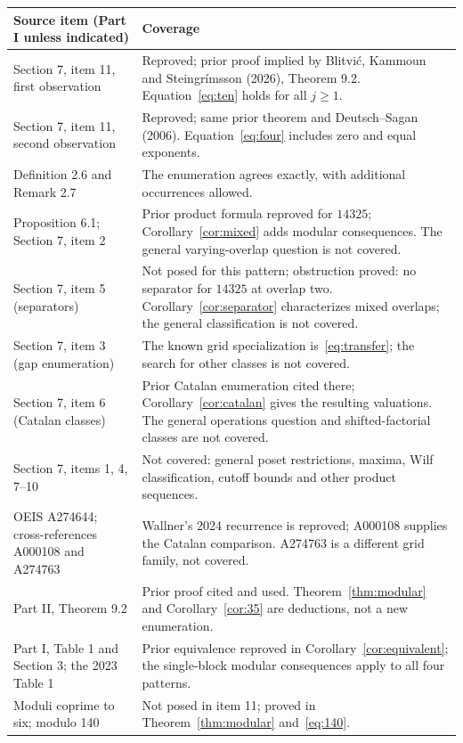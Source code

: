 \documentclass[11pt]{article}
\begin{document}
{\small
\begin{longtable}{p{.40\linewidth}p{.50\linewidth}}
\toprule
Source item (Part I unless indicated)&Coverage\\\midrule
\endhead
Section 7, item 11, first observation&Reproved; prior proof implied by Blitvi\'c, Kammoun and Steingr\'imsson (2026), Theorem 9.2. Equation~\eqref{eq:ten} holds for all $j\geq1$.\\
Section 7, item 11, second observation&Reproved; same prior theorem and Deutsch--Sagan (2006). Equation~\eqref{eq:four} includes zero and equal exponents.\\
Definition 2.6 and Remark 2.7&The enumeration agrees exactly, with additional occurrences allowed.\\
Proposition 6.1; Section 7, item 2&Prior product formula reproved for $14325$; Corollary~\ref{cor:mixed} adds modular consequences. The general varying-overlap question is not covered.\\
Section 7, item 5 (separators)&Not posed for this pattern; obstruction proved: no separator for $14325$ at overlap two. Corollary~\ref{cor:separator} characterizes mixed overlaps; the general classification is not covered.\\
Section 7, item 3 (gap enumeration)&The known grid specialization is~\eqref{eq:transfer}; the search for other classes is not covered.\\
Section 7, item 6 (Catalan classes)&Prior Catalan enumeration cited there; Corollary~\ref{cor:catalan} gives the resulting valuations. The general operations question and shifted-factorial classes are not covered.\\
Section 7, items 1, 4, 7--10&Not covered: general poset restrictions, maxima, Wilf classification, cutoff bounds and other product sequences.\\
OEIS A274644; cross-references A000108 and A274763&Wallner's 2024 recurrence is reproved; A000108 supplies the Catalan comparison. A274763 is a different grid family, not covered.\\
Part II, Theorem 9.2&Prior proof cited and used. Theorem~\ref{thm:modular} and Corollary~\ref{cor:35} are deductions, not a new enumeration.\\
Part I, Table 1 and Section 3; the 2023 Table 1&Prior equivalence reproved in Corollary~\ref{cor:equivalent}; the single-block modular consequences apply to all four patterns.\\
Moduli coprime to six; modulo 140&Not posed in item 11; proved in Theorem~\ref{thm:modular} and~\eqref{eq:140}.\\
\bottomrule
\end{longtable}
}
\end{document}
